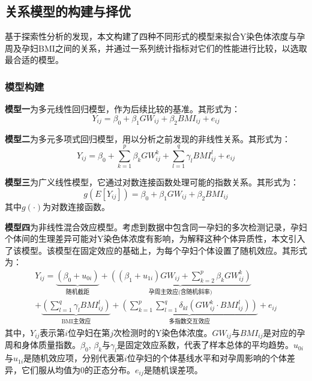 \subsection{关系模型的构建与择优}


基于探索性分析的发现，本文构建了四种不同形式的模型来拟合Y染色体浓度与孕周及孕妇BMI之间的关系，并通过一系列统计指标对它们的性能进行比较，以选取最合适的模型。


\subsubsection{模型构建}
\textbf{模型一}为多元线性回归模型，作为后续比较的基准。其形式为：
\begin{equation}
Y_{ij} = \beta_0 + \beta_1 GW_{ij} + \beta_2 BMI_{ij} + e_{ij}
\end{equation}

\textbf{模型二}为多元多项式回归模型，用以分析之前发现的非线性关系。其形式为：
\begin{equation}
Y_{ij} = \beta_0 + \sum_{k=1}^p \beta_k GW_{ij}^k + \sum_{l=1}^q \gamma_l BMI_{ij}^l + e_{ij}
\end{equation}

\textbf{模型三}为广义线性模型，它通过对数连接函数处理可能的指数关系。其形式为：
\begin{equation}
g(E[Y_{ij}]) = \beta_0 + \beta_1 GW_{ij} + \beta_2 BMI_{ij}
\end{equation}
其中$g(\cdot)$为对数连接函数。

\textbf{模型四}为非线性混合效应模型。考虑到数据中包含同一孕妇的多次检测记录，孕妇个体间的生理差异可能对Y染色体浓度有影响，为解释这种个体异质性，本文引入了该模型。该模型在固定效应的基础上，为每个孕妇个体设置了随机效应。其形式为：
\begin{equation}
\begin{split}
Y_{ij} = \underbrace{(\beta_0 + u_{0i})}_\text{随机截距} + \underbrace{\left((\beta_1 + u_{1i})GW_{ij} + \sum_{k=2}^p \beta_k GW_{ij}^k\right)}_\text{孕周主效应(含随机斜率)} \\
+ \underbrace{\left(\sum_{l=1}^q \gamma_l BMI_{ij}^l\right)}_\text{BMI主效应} + \underbrace{\left(\sum_{k=1}^p \sum_{l=1}^q \delta_{kl} (GW_{ij}^k \cdot BMI_{ij}^l)\right)}_\text{多指数交互效应} + e_{ij}
\end{split}
\end{equation}
其中，$Y_{ij}$表示第$i$位孕妇在第$j$次检测时的Y染色体浓度。$GW_{ij}$与$BMI_{ij}$是对应的孕周和身体质量指数。$\beta_0$, $\beta_k$与$\gamma_l$是固定效应系数，代表了样本总体的平均趋势。$u_{0i}$与$u_{1i}$是随机效应项，分别代表第$i$位孕妇的个体基线水平和对孕周影响的个体差异，它们服从均值为0的正态分布。$e_{ij}$是随机误差项。


